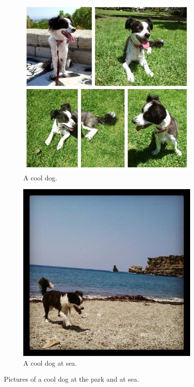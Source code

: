 \documentclass{ieeetran}
\begin{document}
\begin{figure}[t]
    \centering
    \begin{subfigure}[c]{.45\textwidth}
        \includegraphics[width=\textwidth]{figs/lucy1}
        \caption[A cool dog.]{A cool dog.}
        \label{fig:lucy1}
    \end{subfigure}
    \hfill
    \begin{subfigure}[c]{.45\textwidth}
        \centering
        \includegraphics[width=\textwidth]{figs/lucy2}
        \caption[A cool dog at sea.]{A cool dog at sea.}
        \label{fig:lucy2}
   \end{subfigure}
    \caption[Dog Pictures]{
        Pictures of a cool dog at the park and at sea.
    }
    \label{fig:dogs}
\end{figure}
\end{document}
